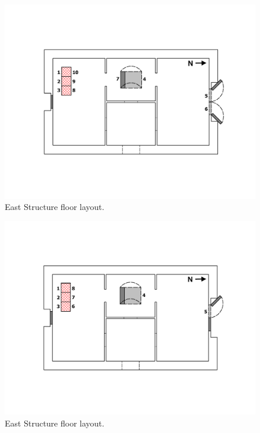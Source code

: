 \documentclass[12pt,oneside]{book}
\begin{document}
\begin{figure}[!ht]
	\includegraphics[width=\columnwidth]{../Figures/Floor_Plans/East_Structure_Test_5}
	\caption[Dimensioned floor plan of the East Structure.]{East Structure floor layout.}
	\label{fig:east_test_5}
\end{figure}

\begin{figure}[!ht]
	\includegraphics[width=\columnwidth]{../Figures/Floor_Plans/East_Structure_Test_6}
	\caption[Dimensioned floor plan of the East Structure.]{East Structure floor layout.}
	\label{fig:east_test_6}
\end{figure}
\end{document}
